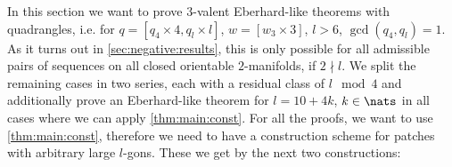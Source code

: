 
In this section we want to prove $3$-valent {\sc Eberhard}-like theorems with quadrangles, i.e. for $q = [q_4 \times 4, q_l \times l]$, $w = [w_3 \times 3]$, $l > 6$, $\gcd(q_4, q_l) = 1$. As it turns out in \autoref{sec:negative:results}, this is only possible for all admissible pairs of sequences on all closed orientable $2$-manifolds, if $2 \nmid l$. We split the remaining cases in two series, each with a residual class of $l \mod 4$ and additionally prove an {\sc Eberhard}-like theorem for $l = 10 + 4k$, $k \in \nats$ in all cases where we can apply \autoref{thm:main:const}. 
\clearpage
For all the proofs, we want to use \autoref{thm:main:const}, therefore we need to have a construction scheme for patches with arbitrary large $l$-gons. These we get by the next two constructions:
